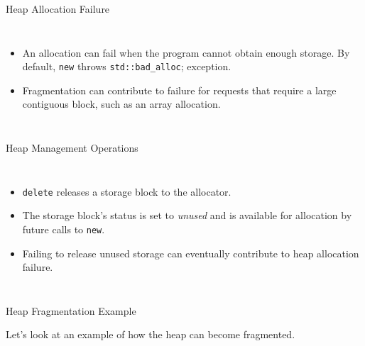 \documentclass[14pt,aspectratio=1610]{beamer}
\begin{document}
\begin{frame}{Heap Allocation Failure}
\begin{columns}
  \begin{itemize}[<+->]
  \item
    An allocation can fail when the program cannot obtain enough storage. By
  default, \lstinline{new} throws \lstinline{std::bad_alloc}; exception.
  \item
    Fragmentation can contribute to failure for requests that require a large
  contiguous block, such as an array allocation.
  \end{itemize}
  \vspace{1.5em}
  
\end{columns}
\end{frame}

\begin{frame}{Heap Management Operations}
\begin{columns}
  \begin{itemize}[<+->]
  \item
    \lstinline{delete} releases a storage block to the allocator.
  \item
    The storage block's status is set to \textit{unused} and
    is available for allocation by future calls to \lstinline{new}.
  \item
    Failing to release unused storage can eventually contribute to heap allocation
  failure.
  \end{itemize}
  \vspace{1.5em}
  
\end{columns}
\end{frame}

\begin{frame}{Heap Fragmentation Example}
  \begin{center}\Large
  Let's look at an example of how the heap can become fragmented.
\end{center}
\end{frame}
\end{document}
